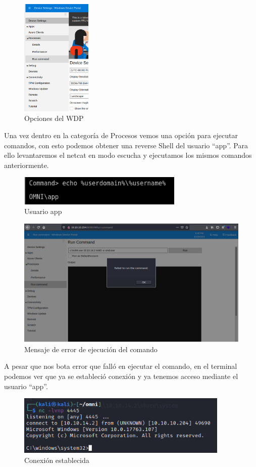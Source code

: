 \documentclass{article}
\begin{document}
\begin{figure}[H]
	\center
	\includegraphics[width=0.3\textwidth]{images/omni/20.png}
	\caption{Opciones del WDP}
\end{figure}

Una vez dentro en la categoría de Procesos vemos una opción para ejecutar comandos, con esto podemos obtener una reverse Shell del usuario “app”. Para ello levantaremos el netcat en modo escucha y ejecutamos los mismos comandos anteriormente.
\begin{figure}[H]
	\center
	\includegraphics[width=0.7\textwidth]{images/omni/21.png}
	\caption{Usuario app}
\end{figure}
\begin{figure}[H]
	\center
	\includegraphics[width=\textwidth]{images/omni/22.png}
	\caption{Mensaje de error de ejecución del comando}
\end{figure}

A pesar que nos bota error que falló en ejecutar el comando, en el terminal podemos ver que ya se estableció conexión y ya tenemos acceso mediante el usuario “app”.
\begin{figure}[H]
	\center
	\includegraphics[width=0.9\textwidth]{images/omni/23.png}
	\caption{Conexión establecida}
\end{figure}
\end{document}
